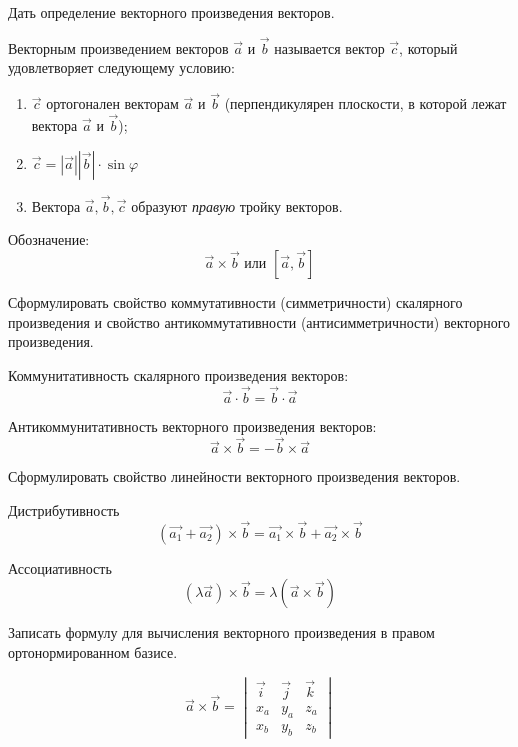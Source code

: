 \begin{question}
  Дать определение векторного произведения векторов.
\end{question}
\begin{answer}
  Векторным произведением векторов $\vec{a}$ и $\vec{b}$ называется вектор $\vec{c}$, который удовлетворяет следующему условию:
  \begin{enumerate}
    \item $\vec{c}$ ортогонален векторам $\vec{a}$ и $\vec{b}$ (перпендикулярен плоскости, в которой лежат вектора $\vec{a}$ и $\vec{b}$);
    \item $\vec{c} = |\vec{a}| |\vec{b}| \cdot \sin \varphi$
    \item Вектора $\vec{a}, \vec{b}, \vec{c}$ образуют \textit{правую} тройку векторов.
  \end{enumerate}
  Обозначение: \[
    \vec{a} \times \vec{b} \text{ или } [\vec{a}, \vec{b}]
  \]   
\end{answer}

\begin{question}
  Сформулировать свойство коммутативности (симметричности) скалярного произведения и свойство антикоммутативности (антисимметричности) векторного произведения.
\end{question}
\begin{answer}
  Коммунитативность скалярного произведения векторов: \[
    \vec{a} \cdot \vec{b} = \vec{b} \cdot \vec{a}
  \] 

  Антикоммунитативность векторного произведения векторов: \[
    \vec{a} \times \vec{b} = - \vec{b} \times \vec{a}  
  \] 
\end{answer}

\begin{question}
  Сформулировать свойство линейности векторного произведения векторов.
\end{question}
\begin{answer}
  Дистрибутивность \[
    (\vec{a_1} + \vec{a_2}) \times \vec{b} = \vec{a_1} \times \vec{b} + \vec{a_2} \times  \vec{b} 
  \]  

  Ассоциативность \[
    (\lambda \vec{a}) \times \vec{b} = \lambda (\vec{a} \times \vec{b})  
  \]  
\end{answer}

\begin{question}
  Записать формулу для вычисления векторного произведения в правом ортонормированном базисе.
\end{question}
\begin{answer}
  \[
  \vec{a} \times \vec{b} = 
  \begin{vmatrix}
    \vec{i} & \vec{j} & \vec{k} \\
    x_a & y_a & z_a \\
    x_b & y_b & z_b 
  \end{vmatrix}
  \] 
\end{answer}

